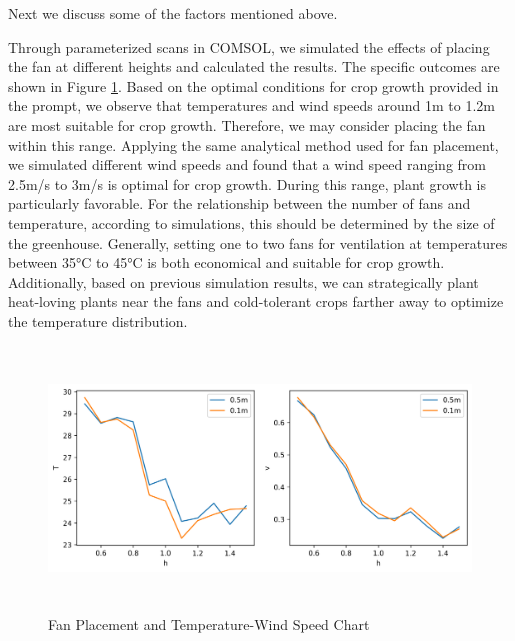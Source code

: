 \documentclass{apmcmthesis}
\begin{document}
{Next we discuss some of the factors mentioned above.



Through parameterized scans in COMSOL, we simulated the effects of placing the fan at different heights and calculated the results. The specific outcomes are shown in Figure \ref{Fan Placement and Temperature-Wind Speed Chart}. Based on the optimal conditions for crop growth provided in the prompt, we observe that temperatures and wind speeds around 1m to 1.2m are most suitable for crop growth. Therefore, we may consider placing the fan within this range.
Applying the same analytical method used for fan placement, we simulated different wind speeds and found that a wind speed ranging from 2.5m/s to 3m/s is optimal for crop growth. During this range, plant growth is particularly favorable. For the relationship between the number of fans and temperature, according to simulations, this should be determined by the size of the greenhouse. Generally, setting one to two fans for ventilation at temperatures between 35°C to 45°C is both economical and suitable for crop growth. Additionally, based on previous simulation results, we can strategically plant heat-loving plants near the fans and cold-tolerant crops farther away to optimize the temperature distribution.
\begin{figure}[htbp]
	\centering
	\includegraphics[width=15cm,height=7cm]{figures/H.png}
	\caption{Fan Placement and Temperature-Wind Speed Chart} %
	\label{Fan Placement and Temperature-Wind Speed Chart} %
 \end{figure}

}
\end{document}
